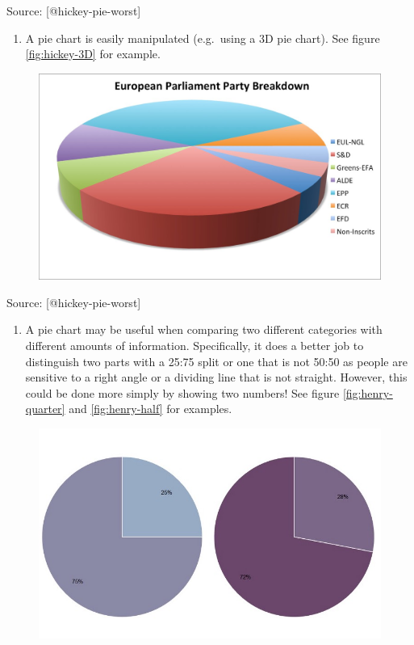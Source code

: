 \documentclass[]{book}
\providecommand{\tightlist}{%
  \setlength{\itemsep}{0pt}\setlength{\parskip}{0pt}}
\theoremstyle{definition}
\theoremstyle{definition}
\theoremstyle{definition}
\theoremstyle{remark}
\begin{document}
Source: {[}@hickey-pie-worst{]}

\begin{enumerate}
\def\labelenumi{\arabic{enumi}.}
\setcounter{enumi}{2}
\tightlist
\item
  A pie chart is easily manipulated (e.g.~using a 3D pie chart). See
  figure \ref{fig:hickey-3D} for example.
\end{enumerate}

\begin{figure}
\centering
\includegraphics{images/hickey-3D.jpg}
\caption{}
\end{figure}

Source: {[}@hickey-pie-worst{]}

\begin{enumerate}
\def\labelenumi{\arabic{enumi}.}
\setcounter{enumi}{3}
\tightlist
\item
  A pie chart may be useful when comparing two different categories with
  different amounts of information. Specifically, it does a better job
  to distinguish two parts with a 25:75 split or one that is not 50:50
  as people are sensitive to a right angle or a dividing line that is
  not straight. However, this could be done more simply by showing two
  numbers! See figure \ref{fig:henry-quarter} and \ref{fig:henry-half}
  for examples.
\end{enumerate}

\begin{figure}
\centering
\includegraphics{images/henry-quarter.png}
\caption{}
\end{figure}
\end{document}
